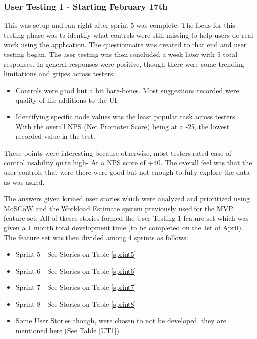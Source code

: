 \subsubsection{User Testing 1 - Starting February 17th} \label{usertestanalysis}
This was setup and ran right after sprint 5 was complete. The focus for this testing phase was to identify what controls were still missing to help users do real work using the application. The questionnaire was created to that end and user testing began. The user testing was then concluded a week later with 5 total responses. In general responses were positive, though there were some trending limitations and gripes across testers:

\begin{itemize}
    \item Controls were good but a bit bare-bones. Most suggestions recorded were quality of life additions to the UI.
    \item Identifying specific node values was the least popular task across testers. With the overall NPS (Net Promoter Score) being at a -25, the lowest recorded value in the test.
\end{itemize}

These points were interesting because otherwise, most testers rated ease of control usability quite high- At a NPS score of +40. The overall feel was that the user controls that were there were good but not enough to fully explore the data as was asked.

The answers given formed user stories which were analyzed and prioritized using MoSCoW and the Workload Estimate system previously used for the MVP feature set. All of theses stories formed the User Testing 1 feature set which was given a 1 month total development time (to be completed on the 1st of April). The feature set was then divided among 4 sprints as follows:

\begin{itemize}
    \item Sprint 5 - See Stories on Table \ref{sprint5}
    \item Sprint 6 - See Stories on Table \ref{sprint6}
    \item Sprint 7 - See Stories on Table \ref{sprint7}
    \item Sprint 8 - See Stories on Table \ref{sprint8}
    \item Some User Stories though, were chosen to not be developed, they are mentioned here (See Table \ref{UT1})
\end{itemize}

